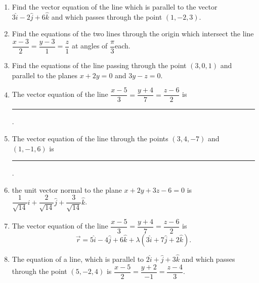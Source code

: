 \begin{enumerate}[label=\thesection.\arabic*,ref=\thesection.\theenumi]
\item  Find the vector equation of the line which is parallel to the vector $3\hat{i}-2\hat{j}+6\hat{k}$ and which passes through the point $(1,-2,3)$.
\item Find the equations of the two lines through the origin which intersect the line $ \dfrac{x-3}{2}=\dfrac{y-3}{1}=\dfrac{z}{1}$ at angles of  $\dfrac{\pi}{3}$each.
\item Find the equations of the line passing through the point $(3,0,1)$ and parallel to the planes $x+2y=0$ and $3y-z=0.$
\item The vector equation of the line $\dfrac{x-5}{3}=\dfrac{y+4}{7}=\dfrac{z-6}{2}$ is \noindent\rule{2cm}{0.4pt}. 
\item The vector equation of the line through the points $(3,4,-7)$ and $(1,-1,6)$ is \noindent\rule{2cm}{0.4pt}.
\item the unit vector normal to the plane $x+2y+3z-6=0$ is $\dfrac{1}{\sqrt{14}}\hat{i} + \dfrac{2}{\sqrt{14}}\hat{j} + \dfrac{3}{\sqrt{14}}\hat{k}$.
\item The vector equation of the line $\dfrac{x-5}{3}=\dfrac{y+4}{7}=\dfrac{z-6}{2}$ is
$$\overrightarrow{r}=5\hat{i}-4\hat{j}+6\hat{k}+\lambda(3\hat{i}+7\hat{j}+2\hat{k}).$$
\item The equation of a line, which is parallel to $2\hat{i}+\hat{j}+3\hat{k}$ and which passes through the point $(5,-2,4)$ is $\dfrac{x-5}{2}=\dfrac{y+2}{-1}=\dfrac{z-4}{3}$.
\end{enumerate}
